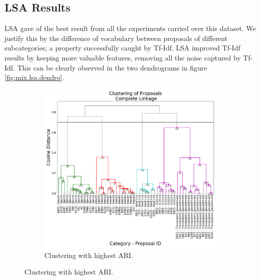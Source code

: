 \subsection{LSA Results}
LSA gave of the best result from all the experiments carried over this dataset. We justify this by the difference of vocabulary between proposals of different subcategories; a property successfully caught by Tf-Idf. LSA improved Tf-Idf results by keeping more valuable features, removing all the noise captured by Tf-Idf. This can be clearly observed in the two dendrograms in figure \ref{fig:mix.lsa.dendro}.
\begin{figure}[!htpb]
  \centering
  \begin{subfigure}[b]{0.55\textwidth}  
  \centering 
  \includegraphics[width=\textwidth]{lsa/BEST_ARI_MIX.png}
  \caption[]%
  {{\small Clustering with highest ARI.}}    
  \label{fig:mix.lsa.ari}
 \end{subfigure}
 \end{figure}

